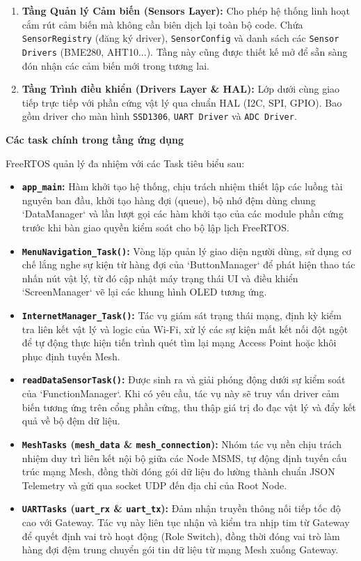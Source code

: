 \documentclass{article} %
\begin{document}
\begin{enumerate}
    \item \textbf{Tầng Quản lý Cảm biến (Sensors Layer):} Cho phép hệ thống linh hoạt cắm rút cảm biến mà không cần biên dịch lại toàn bộ code. Chứa \texttt{SensorRegistry} (đăng ký driver), \texttt{SensorConfig} và danh sách các \texttt{Sensor Drivers} (BME280, AHT10...). Tầng này cũng được thiết kế mở để sẵn sàng đón nhận các cảm biến mới trong tương lai.
    
    \item \textbf{Tầng Trình điều khiển (Drivers Layer \& HAL):} Lớp dưới cùng giao tiếp trực tiếp với phần cứng vật lý qua chuẩn HAL (I2C, SPI, GPIO). Bao gồm driver cho màn hình \texttt{SSD1306}, \texttt{UART Driver} và \texttt{ADC Driver}.
\end{enumerate}

\textbf{Các task chính trong tầng ứng dụng}

FreeRTOS quản lý đa nhiệm với các Task tiêu biểu sau:
\begin{itemize}
    \item \textbf{\texttt{app\_main}:} Hàm khởi tạo hệ thống, chịu trách nhiệm thiết lập các luồng tài nguyên ban đầu, khởi tạo hàng đợi (queue), bộ nhớ đệm dùng chung `DataManager` và lần lượt gọi các hàm khởi tạo của các module phần cứng trước khi bàn giao quyền kiểm soát cho bộ lập lịch FreeRTOS.
    
    \item \textbf{\texttt{MenuNavigation\_Task()}:} Vòng lặp quản lý giao diện người dùng, sử dụng cơ chế lắng nghe sự kiện từ hàng đợi của `ButtonManager` để phát hiện thao tác nhấn nút vật lý, từ đó cập nhật máy trạng thái UI và điều khiển `ScreenManager` vẽ lại các khung hình OLED tương ứng.
    
    \item \textbf{\texttt{InternetManager\_Task()}:} Tác vụ giám sát trạng thái mạng, định kỳ kiểm tra liên kết vật lý và logic của Wi-Fi, xử lý các sự kiện mất kết nối đột ngột để tự động thực hiện tiến trình quét tìm lại mạng Access Point hoặc khôi phục định tuyến Mesh.
    
    \item \textbf{\texttt{readDataSensorTask()}:} Được sinh ra và giải phóng động dưới sự kiểm soát của `FunctionManager`. Khi có yêu cầu, tác vụ này sẽ truy vấn driver cảm biến tương ứng trên cổng phần cứng, thu thập giá trị đo đạc vật lý và đẩy kết quả về bộ đệm dữ liệu.
    
    \item \textbf{\texttt{MeshTasks} (\texttt{mesh\_data} \& \texttt{mesh\_connection}):} Nhóm tác vụ nền chịu trách nhiệm duy trì liên kết nội bộ giữa các Node MSMS, tự động định tuyến cấu trúc mạng Mesh, đồng thời đóng gói dữ liệu đo lường thành chuẩn JSON Telemetry và gửi qua socket UDP đến địa chỉ của Root Node.
    
    \item \textbf{\texttt{UARTTasks} (\texttt{uart\_rx} \& \texttt{uart\_tx}):} Đảm nhận truyền thông nối tiếp tốc độ cao với Gateway. Tác vụ này liên tục nhận và kiểm tra nhịp tim từ Gateway để quyết định vai trò hoạt động (Role Switch), đồng thời đóng vai trò làm hàng đợi đệm trung chuyển gói tin dữ liệu từ mạng Mesh xuống Gateway.
\end{itemize}
\end{document}
